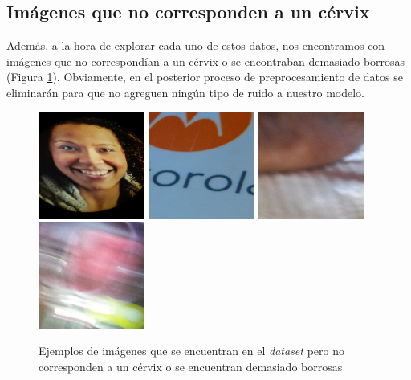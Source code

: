 \subsection{Imágenes que no corresponden a un cérvix}

Además, a la hora de explorar cada uno de estos datos, nos encontramos con imágenes que no correspondían a un cérvix o se encontraban demasiado borrosas (Figura \ref{fig:no-cervix-image}). Obviamente, en el posterior proceso de preprocesamiento de datos se eliminarán para que no agreguen ningún tipo de ruido a nuestro modelo.

\begin{figure}[H]
	\centering
	\includegraphics[width=3.5cm]{img/3086}
	\includegraphics[width=3.5cm]{img/4065}
	\includegraphics[width=3.5cm]{img/4533}
	\includegraphics[width=3.5cm]{img/4367}
	\caption{Ejemplos de imágenes que se encuentran en el \textit{dataset} pero no corresponden a un cérvix o se encuentran demasiado borrosas}
	\label{fig:no-cervix-image}
\end{figure}

